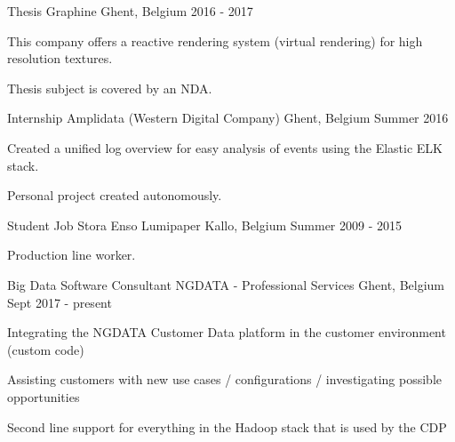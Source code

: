


\begin{cventries}


\cventry
{Thesis} %
{Graphine} %
{Ghent, Belgium} %
{2016 - 2017} %
{ %
\begin{cvitems}
\item {This company offers a reactive rendering system (virtual rendering) for high resolution textures.}
\item {Thesis subject is covered by an NDA.}
\end{cvitems}
}


\cventry
{Internship} %
{Amplidata (Western Digital Company)} %
{Ghent, Belgium} %
{Summer 2016} %
{ %
\begin{cvitems}
\item {Created a unified log overview for easy analysis of events using the Elastic ELK stack.}
\item {Personal project created autonomously.}
\end{cvitems}
}


\cventry
{Student Job} %
{Stora Enso Lumipaper} %
{Kallo, Belgium} %
{Summer 2009 - 2015} %
{ %
\begin{cvitems}
\item {Production line worker.}
\end{cvitems}
}


\cventry
{Big Data Software Consultant} %
{NGDATA - Professional Services} %
{Ghent, Belgium} %
{Sept 2017 - present} %
{ %
\begin{cvitems}
\item {Integrating the NGDATA Customer Data platform in the customer environment (custom code)}
\item {Assisting customers with new use cases / configurations / investigating possible opportunities}
\item {Second line support for everything in the Hadoop stack that is used by the CDP}
\end{cvitems}
}


\end{cventries}
